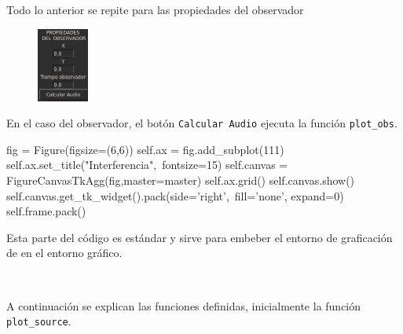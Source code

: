 Todo lo anterior se repite para las propiedades del observador

\begin{figure}[htbp]
	\centering
	\includegraphics[width=0.15\textwidth]
	{./pictures/environment_obs.png}
	\label{fig:env_obs}
\end{figure}

En el caso del observador, el botón \texttt{Calcular Audio} ejecuta la 
función \texttt{plot\_obs}.

\begin{listing}[style=python, numbers = none]
    fig = Figure(figsize=(6,6))
    self.ax = fig.add_subplot(111)
    self.ax.set_title("Interferencia",\
    fontsize=15)
    self.canvas = FigureCanvasTkAgg(fig,master=master)
    self.ax.grid()
    self.canvas.show()
    self.canvas.get_tk_widget().pack(side='right',\
    fill='none', expand=0)
    self.frame.pack()
\end{listing}
Esta parte del código es estándar y sirve para embeber el entorno de 
graficación de \matplotlib en el entorno gráfico.

\

A continuación se explican las funciones definidas, inicialmente la función
\texttt{plot\_source}.


